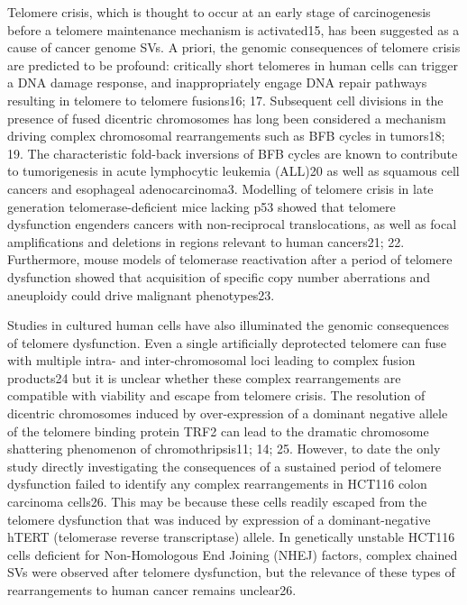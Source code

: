 \documentclass[phd,tocprelim]{cornell}
\begin{document}
Telomere crisis, which is thought to occur at an early stage of carcinogenesis before a telomere maintenance mechanism is activated15, has been suggested as a cause of cancer genome SVs. A priori, the genomic consequences of telomere crisis are predicted to be profound: critically short telomeres in human cells can trigger a DNA damage response, and inappropriately engage DNA repair pathways resulting in telomere to telomere fusions16; 17. Subsequent cell divisions in the presence of fused dicentric chromosomes has long been considered a mechanism driving complex chromosomal rearrangements such as BFB cycles in tumors18; 19. The characteristic fold-back inversions of BFB cycles are known to contribute to tumorigenesis in acute lymphocytic leukemia (ALL)20 as well as squamous cell cancers and esophageal adenocarcinoma3. Modelling of telomere crisis in late generation telomerase-deficient mice lacking p53 showed that telomere dysfunction engenders cancers with non-reciprocal translocations, as well as focal amplifications and deletions in regions relevant to human cancers21; 22. Furthermore, mouse models of telomerase reactivation after a period of telomere dysfunction showed that acquisition of specific copy number aberrations and aneuploidy could drive malignant phenotypes23. 

Studies in cultured human cells have also illuminated the genomic consequences of telomere dysfunction. Even a single artificially deprotected telomere can fuse with multiple intra- and inter-chromosomal loci leading to complex fusion products24 but it is unclear whether these complex rearrangements are compatible with viability and escape from telomere crisis. The resolution of dicentric chromosomes induced by over-expression of a dominant negative allele of the telomere binding protein TRF2 can lead to the dramatic chromosome shattering phenomenon of chromothripsis11; 14; 25. However, to date the only study directly investigating the consequences of a sustained period of telomere dysfunction failed to identify any complex rearrangements in HCT116 colon carcinoma cells26. This may be because these cells readily escaped from the telomere dysfunction that was induced by expression of a dominant-negative hTERT (telomerase reverse transcriptase) allele. In genetically unstable HCT116 cells deficient for Non-Homologous End Joining (NHEJ) factors, complex chained SVs were observed after telomere dysfunction, but the relevance of these types of rearrangements to human cancer remains unclear26. 
\end{document}
